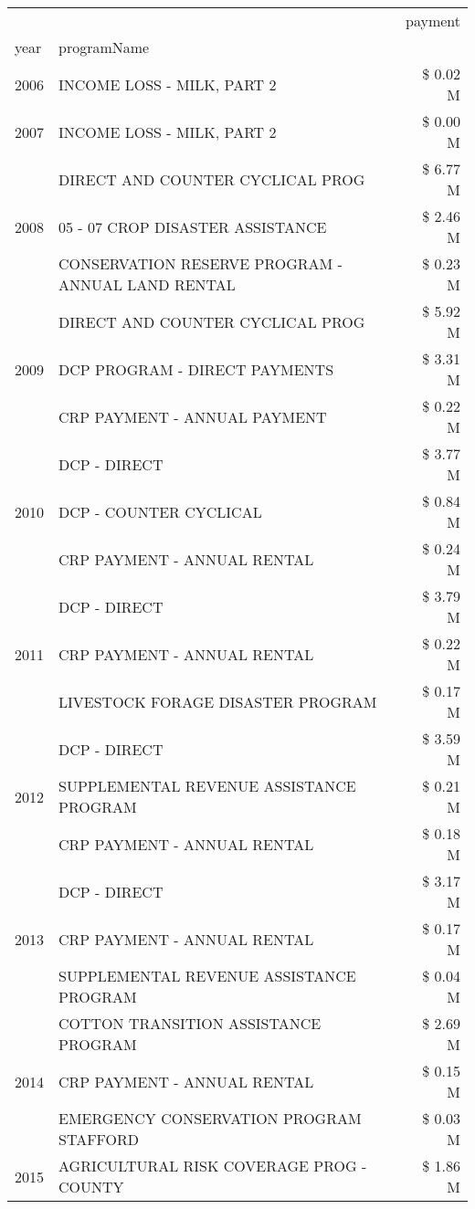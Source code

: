 \begin{tabular}{llr}
\toprule
 &  & payment \\
year & programName &  \\
\midrule
2006 & INCOME LOSS - MILK, PART 2 & \$ 0.02 M \\
\cline{1-3}
2007 & INCOME LOSS - MILK, PART 2 & \$ 0.00 M \\
\cline{1-3}
\multirow[t]{3}{*}{2008} & DIRECT AND COUNTER CYCLICAL PROG & \$ 6.77 M \\
 & 05 - 07 CROP DISASTER ASSISTANCE & \$ 2.46 M \\
 & CONSERVATION RESERVE PROGRAM - ANNUAL LAND RENTAL & \$ 0.23 M \\
\cline{1-3}
\multirow[t]{3}{*}{2009} & DIRECT AND COUNTER CYCLICAL PROG & \$ 5.92 M \\
 & DCP PROGRAM - DIRECT PAYMENTS & \$ 3.31 M \\
 & CRP PAYMENT - ANNUAL PAYMENT & \$ 0.22 M \\
\cline{1-3}
\multirow[t]{3}{*}{2010} & DCP - DIRECT & \$ 3.77 M \\
 & DCP - COUNTER CYCLICAL & \$ 0.84 M \\
 & CRP PAYMENT - ANNUAL RENTAL & \$ 0.24 M \\
\cline{1-3}
\multirow[t]{3}{*}{2011} & DCP - DIRECT & \$ 3.79 M \\
 & CRP PAYMENT - ANNUAL RENTAL & \$ 0.22 M \\
 & LIVESTOCK FORAGE DISASTER PROGRAM & \$ 0.17 M \\
\cline{1-3}
\multirow[t]{3}{*}{2012} & DCP - DIRECT & \$ 3.59 M \\
 & SUPPLEMENTAL REVENUE ASSISTANCE PROGRAM & \$ 0.21 M \\
 & CRP PAYMENT - ANNUAL RENTAL & \$ 0.18 M \\
\cline{1-3}
\multirow[t]{3}{*}{2013} & DCP - DIRECT & \$ 3.17 M \\
 & CRP PAYMENT - ANNUAL RENTAL & \$ 0.17 M \\
 & SUPPLEMENTAL REVENUE ASSISTANCE PROGRAM & \$ 0.04 M \\
\cline{1-3}
\multirow[t]{3}{*}{2014} & COTTON TRANSITION ASSISTANCE PROGRAM & \$ 2.69 M \\
 & CRP PAYMENT - ANNUAL RENTAL & \$ 0.15 M \\
 & EMERGENCY CONSERVATION PROGRAM STAFFORD & \$ 0.03 M \\
\cline{1-3}
\multirow[t]{3}{*}{2015} & AGRICULTURAL RISK COVERAGE PROG - COUNTY & \$ 1.86 M \\

\end{tabular}

